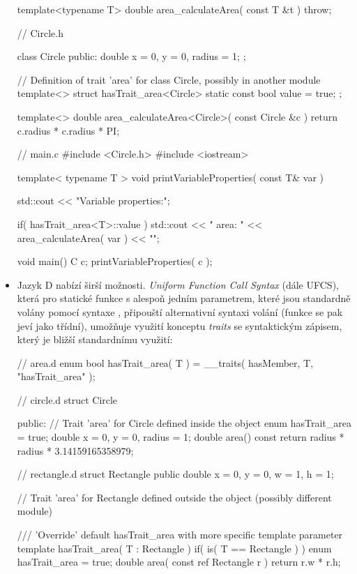 \begin{itemize}
\begin{cppcode}
template<typename T>
double area_calculateArea( const T &t ) {
	throw;
}

// Circle.h

class Circle {
	public: double x = 0, y = 0, radius = 1;
};

// Definition of trait 'area' for class Circle, possibly in another module
template<>
struct hasTrait_area<Circle> { static const bool value = true; };

template<>
double area_calculateArea<Circle>( const Circle &c ) {
	return c.radius * c.radius * PI;
}

// main.c
#include <Circle.h>
#include <iostream>

template< typename T >
void printVariableProperties( const T& var ) {
	std::cout << "Variable properties:\n";
	
	if( hasTrait_area<T>::value )
		std::cout << "  area: " << area_calculateArea( var ) << "\n";
}

void main() {
	C c;
	printVariableProperties( c );
}
	\end{cppcode}

	\item Jazyk D nabízí širší možnosti. \textit{Uniform Function Call Syntax} (dále UFCS), která pro statické funkce s alespoň jedním parametrem, které jsou standardně volány pomocí syntaxe , připouští alternativní syntaxi volání  (funkce se pak jeví jako třídní), umožňuje využití konceptu \textit{traits} se syntaktickým zápisem, který je bližší standardnímu využití:
	\begin{dcode}
// area.d
enum bool hasTrait_area( T ) = __traits( hasMember, T, "hasTrait_area" );

// circle.d
struct Circle {
	
public:
	// Trait 'area' for Circle defined inside the object
	enum hasTrait_area = true;
	double x = 0, y = 0, radius = 1;
	double area() const {
		return radius * radius * 3.14159165358979;	
	}	
	
}

// rectangle.d
struct Rectangle {
	public double x = 0, y = 0, w = 1, h = 1;
}

// Trait 'area' for Rectangle defined outside the object (possibly different module)

/// 'Override' default hasTrait_area with more specific template parameter
template hasTrait_area( T : Rectangle ) if( is( T == Rectangle ) ) {
	enum hasTrait_area  = true;
}
double area( const ref Rectangle r ) {
	return r.w * r.h;
}



\end{dcode}
\end{itemize}
